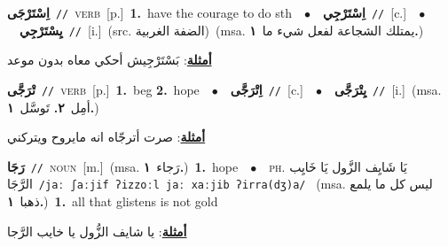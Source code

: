 \documentclass[10pt,a4paper,twoside]{article} %
\begin{document}
\begin{multicols}{2}
{\setlength\topsep{0pt}\textbf{\foreignlanguage{arabic}{اِسْتَرْجَى}}\ {\color{gray}\texttt{//}\color{black}}\ \textsc{verb}\ [p.]\ \textbf{1.}~have the courage to do sth\ \ $\bullet$\ \ \setlength\topsep{0pt}\textbf{\foreignlanguage{arabic}{اِسْتَرْجِي}}\ {\color{gray}\texttt{//}\color{black}}\ [c.]\ \ $\bullet$\ \ \setlength\topsep{0pt}\textbf{\foreignlanguage{arabic}{يِسْتَرْجِي}}\ {\color{gray}\texttt{//}\color{black}}\ [i.]\ (src. \color{gray}\foreignlanguage{arabic}{الضفة الغربية}\color{black})\ \color{gray}(msa. \foreignlanguage{arabic}{يمتلك الشجاعة لفعل شيء ما}~\foreignlanguage{arabic}{\textbf{١.}})\color{black}\  \begin{flushright}\color{gray}\foreignlanguage{arabic}{\textbf{\underline{\foreignlanguage{arabic}{أمثلة}}}: بَسْتَرْجِيش أحكي معاه بدون موعد}\end{flushright}\color{black}} \vspace{2mm}

{\setlength\topsep{0pt}\textbf{\foreignlanguage{arabic}{تْرَجَّى}}\ {\color{gray}\texttt{//}\color{black}}\ \textsc{verb}\ [p.]\ \textbf{1.}~beg  \textbf{2.}~hope\ \ $\bullet$\ \ \setlength\topsep{0pt}\textbf{\foreignlanguage{arabic}{اِتْرَجَّى}}\ {\color{gray}\texttt{//}\color{black}}\ [c.]\ \ $\bullet$\ \ \setlength\topsep{0pt}\textbf{\foreignlanguage{arabic}{يِتْرَجَّى}}\ {\color{gray}\texttt{//}\color{black}}\ [i.]\ \color{gray}(msa. \foreignlanguage{arabic}{أمِل}~\foreignlanguage{arabic}{\textbf{٢.}}  \foreignlanguage{arabic}{تَوسَّل}~\foreignlanguage{arabic}{\textbf{١.}})\color{black}\  \begin{flushright}\color{gray}\foreignlanguage{arabic}{\textbf{\underline{\foreignlanguage{arabic}{أمثلة}}}: صرت أترجّاه انه مايروح ويتركني}\end{flushright}\color{black}} \vspace{2mm}

{\setlength\topsep{0pt}\textbf{\foreignlanguage{arabic}{رَجَا}}\ {\color{gray}\texttt{//}\color{black}}\ \textsc{noun}\ [m.]\ \color{gray}(msa. \foreignlanguage{arabic}{رَجاء}~\foreignlanguage{arabic}{\textbf{١.}})\color{black}\ \textbf{1.}~hope\ \ $\bullet$\ \ \textsc{ph.} \color{gray} \foreignlanguage{arabic}{يَا شَايِف الزَّول يَا خَايِب الرَّجَا}\color{black}\ {\color{gray}\texttt{/{\sffamily jaː ʃaːjif ʔizzoːl jaː xaːjib ʔirra(dʒ)a}/}\color{black}}\ \color{gray} (msa. \foreignlanguage{arabic}{ليس كل ما يلمع ذهبا}~\foreignlanguage{arabic}{\textbf{١.}})\color{black}\ \textbf{1.}~all that glistens is not gold\  \begin{flushright}\color{gray}\foreignlanguage{arabic}{\textbf{\underline{\foreignlanguage{arabic}{أمثلة}}}: يا شايف الزُّول يا خايب الرَّجا}\end{flushright}\color{black}} \vspace{2mm}


\end{multicols}
\end{document}
